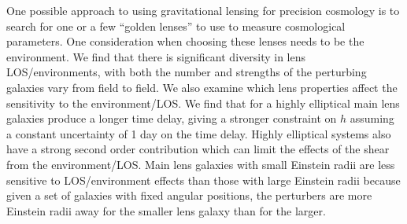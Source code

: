 One possible approach to using gravitational lensing for precision cosmology is to search for one or a few ``golden lenses'' to use to measure cosmological parameters. One consideration when choosing these lenses needs to be the environment. We find that there is significant diversity in lens LOS/environments, with both the number and strengths of the perturbing galaxies vary from field to field.  We also examine which lens properties affect the sensitivity to the environment/LOS. We find that for a highly elliptical main lens galaxies produce a longer time delay, giving a stronger constraint on $h$ assuming a constant uncertainty of 1 day on the time delay. Highly elliptical systems also have a strong second order contribution which can limit the effects of the shear from the environment/LOS. Main lens galaxies with small Einstein radii are less sensitive to LOS/environment effects than those with large Einstein radii because given a set of galaxies with fixed angular positions, the perturbers are more Einstein radii away for the smaller lens galaxy than for the larger.